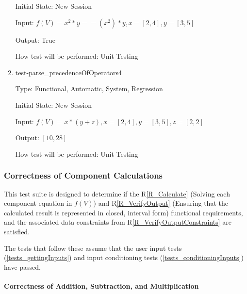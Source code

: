 \documentclass[12pt, titlepage]{article}
\newcommand{\rref}[1]{R\ref{#1}}
\begin{document}
\begin{enumerate}
	Initial State: New Session
	
	Input: $f(V) = x^2 * y == (x^2) * y, x = [2,4], y = [3,5]$
	
	Output: True
	
	How test will be performed: Unit Testing\\	
	
	\item{test-parse\_precedenceOfOperators4}
	
	Type: Functional, Automatic, System, Regression
	
	Initial State: New Session
	
	Input: $f(V) = x * (y + z), x = [2,4], y = [3,5], z = [2,2]$
	
	Output: $[10, 28]$
	
	How test will be performed: Unit Testing\\
	
\end{enumerate}

\subsubsection{Correctness of Component Calculations}
\label{tests_correctnessOfCalculations}
This test suite is designed to determine if the \rref{R_Calculate} 
(Solving each component equation in $f(V)$) and \rref{R_VerifyOutput} (Ensuring 
that the calculated result is represented in closed, interval form) functional 
requirements, and the associated data constraints from 
\rref{R_VerifyOutputConstraints} are satisfied.

The tests that follow these assume that the user input tests 
(\ref{tests_gettingInputs}) and input conditioning tests 
(\ref{tests_conditioningInputs}) have passed.

\paragraph{Correctness of Addition, Subtraction, and Multiplication}
\end{document}
